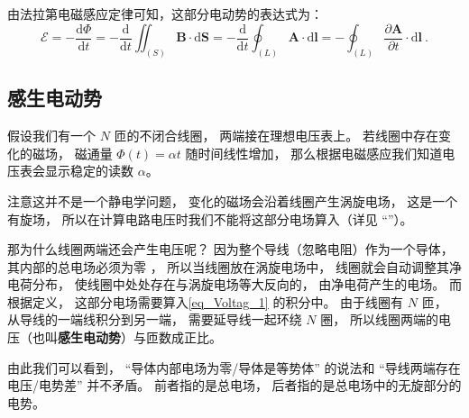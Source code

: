 由法拉第电磁感应定律可知，这部分电动势的表达式为：
\begin{equation}
\mathscr{E}=-\frac{\mathrm{d} \Phi}{\mathrm{d} t}=-\frac{\mathrm{d}}{\mathrm{d} t} \iint_{(S)} \boldsymbol{B} \cdot \mathrm{d} \boldsymbol{S}=-\frac{\mathrm{d}}{\mathrm{d} t} \oint_{(L)} \boldsymbol{A} \cdot \mathrm{d} \boldsymbol{l}=-\oint_{(L)} \frac{\partial \boldsymbol{A}}{\partial t} \cdot \mathrm{d} \boldsymbol{l}~.
\end{equation}

\subsection{感生电动势}
\begin{example}{}
假设我们有一个 $N$ 匝的不闭合线圈， 两端接在理想电压表上。 若线圈中存在变化的磁场， 磁通量 $\Phi(t) = \alpha t$ 随时间线性增加， 那么根据电磁感应我们知道电压表会显示稳定的读数 $\alpha$。

注意这并不是一个静电学问题， 变化的磁场会沿着线圈产生涡旋电场， 这是一个有旋场， 所以在计算电路电压时我们不能将这部分电场算入（详见 “”）。

那为什么线圈两端还会产生电压呢？ 因为整个导线（忽略电阻）作为一个导体， 其内部的总电场必须为零%
， 所以当线圈放在涡旋电场中， 线圈就会自动调整其净电荷分布， 使线圈中处处存在与涡旋电场等大反向的， 由净电荷产生的电场。 而根据定义， 这部分电场需要算入\autoref{eq_Voltag_1} 的积分中。 由于线圈有 $N$ 匝， 从导线的一端线积分到另一端， 需要延导线一起环绕 $N$ 圈， 所以线圈两端的电压（也叫\textbf{感生电动势}）与匝数成正比。
\end{example}

由此我们可以看到， “导体内部电场为零/导体是等势体” 的说法和 “导线两端存在电压/电势差” 并不矛盾。 前者指的是总电场， 后者指的是总电场中的无旋部分的电势。
